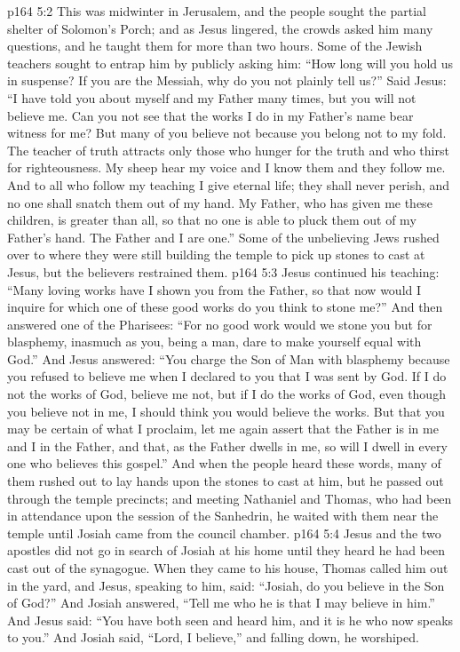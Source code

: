 \vs p164 5:2 This was midwinter in Jerusalem, and the people sought the partial shelter of Solomon’s Porch; and as Jesus lingered, the crowds asked him many questions, and he taught them for more than two hours. Some of the Jewish teachers sought to entrap him by publicly asking him: “How long will you hold us in suspense? If you are the Messiah, why do you not plainly tell us?” Said Jesus: \textcolor{ubdarkred}{“I have told you about myself and my Father many times, but you will not believe me. Can you not see that the works I do in my Father’s name bear witness for me? But many of you believe not because you belong not to my fold. The teacher of truth attracts only those who hunger for the truth and who thirst for righteousness. My sheep hear my voice and I know them and they follow me. And to all who follow my teaching I give eternal life; they shall never perish, and no one shall snatch them out of my hand. My Father, who has given me these children, is greater than all, so that no one is able to pluck them out of my Father’s hand. The Father and I are one.”} Some of the unbelieving Jews rushed over to where they were still building the temple to pick up stones to cast at Jesus, but the believers restrained them.\plusone
\vs p164 5:3 Jesus continued his teaching: \textcolor{ubdarkred}{“Many loving works have I shown you from the Father, so that now would I inquire for which one of these good works do you think to stone me?”} And then answered one of the Pharisees: “For no good work would we stone you but for blasphemy, inasmuch as you, being a man, dare to make yourself equal with God.” And Jesus answered: \textcolor{ubdarkred}{“You charge the Son of Man with blasphemy because you refused to believe me when I declared to you that I was sent by God. If I do not the works of God, believe me not, but if I do the works of God, even though you believe not in me, I should think you would believe the works. But that you may be certain of what I proclaim, let me again assert that the Father is in me and I in the Father, and that, as the Father dwells in me, so will I dwell in every one who believes this gospel.”} And when the people heard these words, many of them rushed out to lay hands upon the stones to cast at him, but he passed out through the temple precincts; and meeting Nathaniel and Thomas, who had been in attendance upon the session of the Sanhedrin, he waited with them near the temple until Josiah came from the council chamber.
\vs p164 5:4 Jesus and the two apostles did not go in search of Josiah at his home until they heard he had been cast out of the synagogue. When they came to his house, Thomas called him out in the yard, and Jesus, speaking to him, said: \textcolor{ubdarkred}{“Josiah, do you believe in the Son of God?”} And Josiah answered, “Tell me who he is that I may believe in him.” And Jesus said: \textcolor{ubdarkred}{“You have both seen and heard him, and it is he who now speaks to you.”} And Josiah said, “Lord, I believe,” and falling down, he worshiped.
